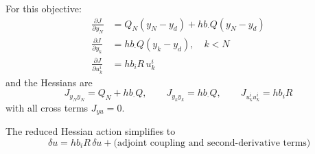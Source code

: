 \documentclass[11pt]{article}
\newcommand{\pder}[2]{\frac{\partial #1}{\partial #2}}
\begin{document}
For this objective:
\begin{align}
\pder{J}{y_N} &= Q_N(y_N-y_d) + hb_{\cdot} Q(y_N-y_d) \\
\pder{J}{y_k} &= h b_{\cdot} Q(y_k-y_d), \quad k < N \\
\pder{J}{u_k^i} &= h b_i R\, u_k^i
\end{align}
and the Hessians are
\begin{equation}
J_{y_N y_N} = Q_N + hb_\cdot Q, \qquad J_{y_k y_k} = hb_\cdot Q, \qquad J_{u_k^i u_k^i} = h b_i R
\end{equation}
with all cross terms $J_{yu} = 0$.

The reduced Hessian action simplifies to
\begin{equation}
[\nabla^2\hat{J}(u)]\,\delta u = hb_i R\,\delta u + \text{(adjoint coupling and second-derivative terms)}
\end{equation}
\end{document}

